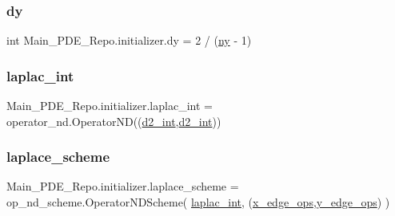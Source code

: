 \subsubsection{\texorpdfstring{dy}{dy}}
{\footnotesize\ttfamily int Main\+\_\+\+P\+D\+E\+\_\+\+Repo.\+initializer.\+dy = 2 / (\hyperlink{namespaceMain__PDE__Repo_1_1initializer_a705f203425c609ebc41db74879bf413a}{ny} -\/ 1)}

\mbox{\label{namespaceMain__PDE__Repo_1_1initializer_a588f8a108166ccbf39c9e31dd69a1a7c}} 
\subsubsection{\texorpdfstring{laplac\+\_\+int}{laplac\_int}}
{\footnotesize\ttfamily Main\+\_\+\+P\+D\+E\+\_\+\+Repo.\+initializer.\+laplac\+\_\+int = operator\+\_\+nd.\+Operator\+ND((\hyperlink{namespaceMain__PDE__Repo_1_1initializer_a657e8b73e6463b4e45e67b4854e3bdcc}{d2\+\_\+int},\hyperlink{namespaceMain__PDE__Repo_1_1initializer_a657e8b73e6463b4e45e67b4854e3bdcc}{d2\+\_\+int}))}

\mbox{\label{namespaceMain__PDE__Repo_1_1initializer_a54a7ff0de91b35f3caa1d521b08d99a9}} 
\subsubsection{\texorpdfstring{laplace\+\_\+scheme}{laplace\_scheme}}
{\footnotesize\ttfamily Main\+\_\+\+P\+D\+E\+\_\+\+Repo.\+initializer.\+laplace\+\_\+scheme = op\+\_\+nd\+\_\+scheme.\+Operator\+N\+D\+Scheme( \hyperlink{namespaceMain__PDE__Repo_1_1initializer_a588f8a108166ccbf39c9e31dd69a1a7c}{laplac\+\_\+int}, (\hyperlink{namespaceMain__PDE__Repo_1_1initializer_a83990a2ef3c33e77b11cc09816b3388c}{x\+\_\+edge\+\_\+ops},\hyperlink{namespaceMain__PDE__Repo_1_1initializer_ae555cb401c7c00308a6d2917bf4459fb}{y\+\_\+edge\+\_\+ops}) )}

